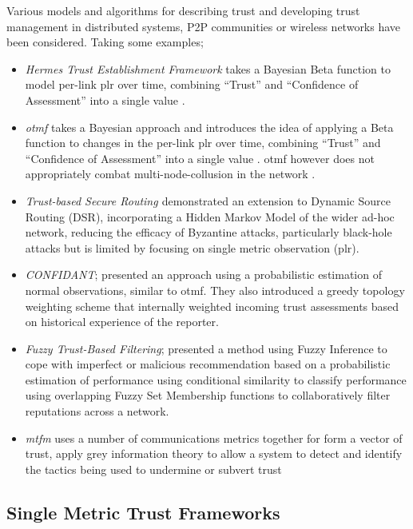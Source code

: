 Various models and algorithms for describing trust and developing trust management in distributed systems, P2P communities or wireless networks have been considered.
Taking some examples;
%
\begin{itemize}
  \item \emph{Hermes Trust Establishment Framework} takes a Bayesian Beta function to model per-link \gls{plr} over time, combining ``Trust'' and ``Confidence of Assessment'' into a single value \cite{Zouridaki2005}.
  \item \emph{\acrfull{otmf}} takes a Bayesian approach and introduces the idea of applying a Beta function to changes in the per-link \gls{plr} over time, combining ``Trust'' and ``Confidence of Assessment'' into a single value \cite{Li2008}.
    \gls{otmf} however does not appropriately combat multi-node-collusion in the network \cite{Cho2011}.
  \item \emph{Trust-based Secure Routing \cite{Moe2008a}} demonstrated an extension to Dynamic Source Routing (DSR), incorporating a Hidden Markov Model of the wider ad-hoc network, reducing the efficacy of Byzantine attacks, particularly black-hole attacks but is limited by focusing on single metric observation (\gls{plr})\cite{Cho2011}.
  \item \emph{CONFIDANT}; \cite{Buchegger2002} presented an approach using a probabilistic estimation of normal observations, similar to \gls{otmf}.
    They also introduced a greedy topology weighting scheme that internally weighted incoming trust assessments based on historical experience of the reporter.
  \item \emph{Fuzzy Trust-Based Filtering}; \cite{Luo2008} presented a method using Fuzzy Inference to cope with imperfect or malicious recommendation based on a probabilistic estimation of performance using conditional similarity to classify performance using overlapping Fuzzy Set Membership functions to collaboratively filter reputations across a network.
  \item \emph{\gls{mtfm}} uses a number of communications metrics together for form a vector of trust, apply grey information theory to allow a system to detect and identify the tactics being used to undermine or subvert trust\cite{Guo11}
\end{itemize}
%

\subsection{Single Metric Trust Frameworks}

